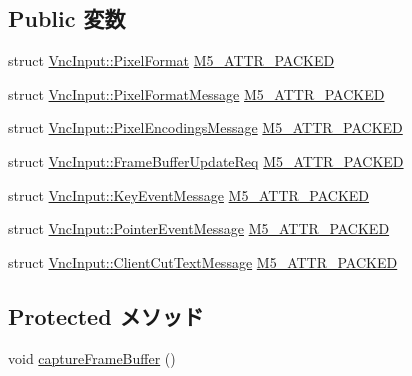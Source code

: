 \subsection*{Public 変数}
\begin{DoxyCompactItemize}
\item 
struct \hyperlink{structVncInput_1_1PixelFormat}{VncInput::PixelFormat} \hyperlink{classVncInput_a6461d9ad3aa5b6efe59b090c8e8f38af}{M5\_\-ATTR\_\-PACKED}
\item 
struct \hyperlink{structVncInput_1_1PixelFormatMessage}{VncInput::PixelFormatMessage} \hyperlink{classVncInput_a461bacc0429ad882aeab850f7dbc363b}{M5\_\-ATTR\_\-PACKED}
\item 
struct \hyperlink{structVncInput_1_1PixelEncodingsMessage}{VncInput::PixelEncodingsMessage} \hyperlink{classVncInput_a83b7836548f8715b41fad8160b0bb6dd}{M5\_\-ATTR\_\-PACKED}
\item 
struct \hyperlink{structVncInput_1_1FrameBufferUpdateReq}{VncInput::FrameBufferUpdateReq} \hyperlink{classVncInput_a01eadfa05c0ec19fe90849fab8e5706d}{M5\_\-ATTR\_\-PACKED}
\item 
struct \hyperlink{structVncInput_1_1KeyEventMessage}{VncInput::KeyEventMessage} \hyperlink{classVncInput_acf72f29fcbdb55be99efe15fd27ca8e8}{M5\_\-ATTR\_\-PACKED}
\item 
struct \hyperlink{structVncInput_1_1PointerEventMessage}{VncInput::PointerEventMessage} \hyperlink{classVncInput_aa0547849b66438129f69b5e83e4c5d01}{M5\_\-ATTR\_\-PACKED}
\item 
struct \hyperlink{structVncInput_1_1ClientCutTextMessage}{VncInput::ClientCutTextMessage} \hyperlink{classVncInput_a7c02cfd94c82d02abac5f31f753a2865}{M5\_\-ATTR\_\-PACKED}
\end{DoxyCompactItemize}
\subsection*{Protected メソッド}
\begin{DoxyCompactItemize}
\item 
void \hyperlink{classVncInput_a5356f969a4a40d8334a0fa3c29a2d0d2}{captureFrameBuffer} ()
\end{DoxyCompactItemize}

